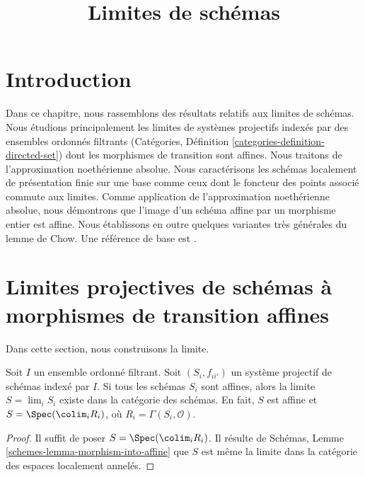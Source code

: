 

%


\title{Limites de schémas}


\maketitle

\label{section-phantom}

\tableofcontents

\section{Introduction}
\label{section-introduction}

\noindent
Dans ce chapitre, nous rassemblons des résultats relatifs aux limites de
schémas. Nous étudions principalement les limites de systèmes projectifs
indexés par des ensembles ordonnés filtrants
(Catégories, Définition \ref{categories-definition-directed-set})
dont les morphismes de transition sont affines. Nous traitons de
l'approximation noethérienne absolue. Nous caractérisons les schémas
localement de présentation finie sur une base comme ceux dont le foncteur
des points associé commute aux limites. Comme application de
l'approximation noethérienne absolue, nous démontrons que l'image d'un
schéma affine par un morphisme entier est affine. Nous établissons en outre
quelques variantes très générales du lemme de Chow. Une référence de base
est \cite{EGA}.




\section{Limites projectives de schémas à morphismes de transition affines}
\label{section-limits}

\noindent
Dans cette section, nous construisons la limite.

\begin{lemma}
\label{lemma-directed-inverse-system-affine-schemes-has-limit}
Soit $I$ un ensemble ordonné filtrant. Soit $(S_i, f_{ii'})$ un système
projectif de schémas indexé par $I$. Si tous les schémas $S_i$ sont
affines, alors la limite $S = \lim_i S_i$ existe dans la catégorie des
schémas. En fait, $S$ est affine et $S = \Spec(\colim_i R_i)$, où
$R_i = \Gamma(S_i, \mathcal{O})$.
\end{lemma}

\begin{proof}
Il suffit de poser $S = \Spec(\colim_i R_i)$.
Il résulte de Schémas, Lemme \ref{schemes-lemma-morphism-into-affine}
que $S$ est même la limite dans la catégorie des espaces localement
annelés.
\end{proof}

